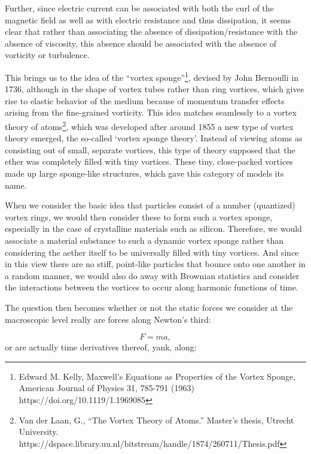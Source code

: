 \documentclass{article}
\begin{document}
Further, since electric current can be associated with both the curl of the magnetic field as well as with electric
resistance and thus dissipation, it seems clear that rather than associating the absence of dissipation/resistance with
the absence of viscosity, this absence should be associated with the absence of vorticity or turbulence. 

This brings us to the idea of the ``vortex sponge''\footnote{ Edward M. Kelly, {\textquotedbl}Maxwell's Equations as
Properties of the Vortex Sponge{\textquotedbl}, American Journal of Physics 31, 785-791 (1963)
https://doi.org/10.1119/1.1969085  \par },  devised by John Bernoulli in 1736, although in the shape of vortex tubes
rather than ring vortices, which gives rise to elastic behavior of the medium because of momentum transfer effects
arising from the fine-grained vorticity. This idea matches seamlessly to a vortex theory of atoms\footnote{ Van der
Laan, G., ``The Vortex Theory of Atoms.'' Master's thesis, Utrecht University.
https://dspace.library.uu.nl/bitstream/handle/1874/260711/Thesis.pdf \par  }, which was developed after around 1855 a
new type of vortex theory emerged, the so-called `vortex sponge theory'. Instead of viewing atoms as consisting out of
small, separate vortices, this type of theory supposed that the ether was completely filled with tiny vortices. These
tiny, close-packed vortices made up large sponge-like structures, which gave this category of models its name. 

When we consider the basic idea that particles consist of a number (quantized) vortex rings, we would then consider
these to form such a vortex sponge, especially in the case of crystalline materials such as silicon. Therefore, we
would associate a material substance to such a dynamic vortex sponge rather than considering the aether itself to be
universally filled with tiny vortices.  And since in this view there are no stiff, point-like particles that bounce
onto one another in a random manner, we would also do away with Brownian statistics and consider the interactions
between the vortices to occur along harmonic functions of time.

The question then becomes whether or not the static forces we consider at the macroscopic level really are forces along
Newton's third:

\begin{equation}
F=ma,
\end{equation}
or are actually time derivatives thereof, yank, along:
\end{document}
